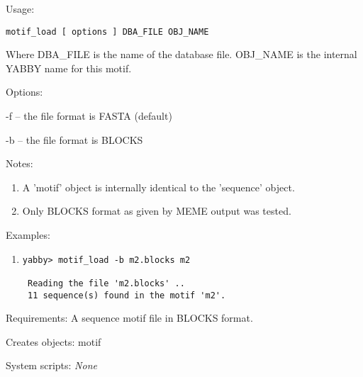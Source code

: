 \begin{description}


\item{Usage:}

{\tt motif\_load [ options ] DBA\_FILE OBJ\_NAME}

 Where DBA\_FILE is the name of the database file. OBJ\_NAME is
 the internal YABBY name for this motif.


\item{Options:}
\begin{description}
\item -f -- the file format is FASTA (default)
\item -b -- the file format is BLOCKS
\end{description}


\item{Notes:}
\begin{enumerate}
\item A 'motif' object is internally identical to the 'sequence' object.
\item Only BLOCKS format as given by MEME output was tested.
\end{enumerate}


\item{Examples:}
\begin{enumerate}

\item
\begin{verbatim}
yabby> motif_load -b m2.blocks m2

 Reading the file 'm2.blocks' ..
 11 sequence(s) found in the motif 'm2'.

\end{verbatim}

\end{enumerate}


\item{Requirements:} A sequence motif file in BLOCKS format.


\item{Creates objects:} motif


\item{System scripts:} {\em None}

\end{description}

